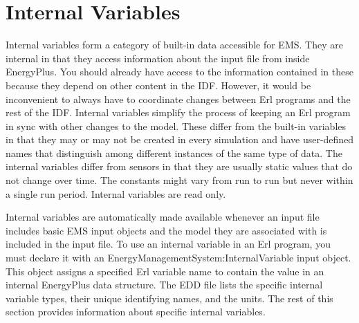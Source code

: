 \chapter{Internal Variables}\label{internal-variables}

Internal variables form a category of built-in data accessible for EMS. They are internal in that they access information about the input file from inside EnergyPlus. You should already have access to the information contained in these because they depend on other content in the IDF. However, it would be inconvenient to always have to coordinate changes between Erl programs and the rest of the IDF. Internal variables simplify the process of keeping an Erl program in sync with other changes to the model. These differ from the built-in variables in that they may or may not be created in every simulation and have user-defined names that distinguish among different instances of the same type of data. The internal variables differ from sensors in that they are usually static values that do not change over time. The constants might vary from run to run but never within a single run period. Internal variables are read only.

Internal variables are automatically made available whenever an input file includes basic EMS input objects and the model they are associated with is included in the input file. To use an internal variable in an Erl program, you must declare it with an EnergyManagementSystem:InternalVariable input object. This object assigns a specified Erl variable name to contain the value in an internal EnergyPlus data structure. The EDD file lists the specific internal variable types, their unique identifying names, and the units. The rest of this section provides information about specific internal variables.
